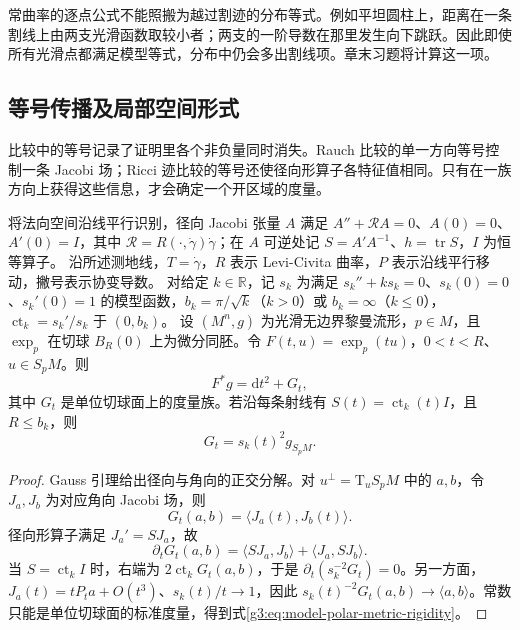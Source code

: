 常曲率的逐点公式不能照搬为越过割迹的分布等式。例如平坦圆柱上，距离在一条割线上由两支光滑函数取较小者；两支的一阶导数在那里发生向下跳跃。因此即使所有光滑点都满足模型等式，分布中仍会多出割线项。章末习题将计算这一项。

\subsection{等号传播及局部空间形式}
\label{g3:subsec:0704:04}

比较中的等号记录了证明里各个非负量同时消失。Rauch 比较的单一方向等号控制一条 Jacobi 场；Ricci 迹比较的等号还使径向形算子各特征值相同。只有在一族方向上获得这些信息，才会确定一个开区域的度量。

\begin{proposition}\label{g3:prop:radial-metric-evolution}
	将法向空间沿线平行识别，径向 Jacobi 张量 \(A\) 满足 \(A''+\mathcal RA=0\)、\(A(0)=0\)、\(A'(0)=I\)，其中 \(\mathcal R=R(\cdot,\dot\gamma)\dot\gamma\)；在 \(A\) 可逆处记 \(S=A'A^{-1}\)、\(h=\operatorname{tr}S\)，\(I\) 为恒等算子。
	沿所述测地线，\(T=\dot\gamma\)，\(R\) 表示 Levi-Civita 曲率，\(P\) 表示沿线平行移动，撇号表示协变导数。
	对给定 \(k\in\mathbb R\)，记 \(s_k\) 为满足 \(s_k''+ks_k=0\)、\(s_k(0)=0\)、\(s_k'(0)=1\) 的模型函数，\(b_k=\pi/\sqrt k\)（\(k>0\)）或 \(b_k=\infty\)（\(k\le0\)），\(\operatorname{ct}_k=s_k'/s_k\) 于 \((0,b_k)\)。
	设 \((M^n,g)\) 为光滑无边界黎曼流形，\(p\in M\)，且 \(\exp_p\) 在切球 \(B_R(0)\) 上为微分同胚。令 \(F(t,u)=\exp_p(tu)\)，\(0<t<R\)、\(u\in S_pM\)。则
	\[
		F^*g=\mathrm{d}t^2+G_t,
	\]
	其中 \(G_t\) 是单位切球面上的度量族。若沿每条射线有 \(S(t)=\operatorname{ct}_k(t)I\)，且 \(R\le b_k\)，则
	\begin{equation}\label{g3:eq:model-polar-metric-rigidity}
		G_t=s_k(t)^2g_{S_pM}.
	\end{equation}
\end{proposition}
\begin{proof}
	Gauss 引理给出径向与角向的正交分解。对 \(u^\perp=\mathrm{T}_uS_pM\) 中的 \(a,b\)，令 \(J_a,J_b\) 为对应角向 Jacobi 场，则
	\[
		G_t(a,b)=\langle J_a(t),J_b(t)\rangle.
	\]
	径向形算子满足 \(J_a'=SJ_a\)，故
	\[
		\partial_tG_t(a,b)
		=\langle SJ_a,J_b\rangle+\langle J_a,SJ_b\rangle.
	\]
	当 \(S=\operatorname{ct}_k I\) 时，右端为 \(2\operatorname{ct}_kG_t(a,b)\)，于是 \(\partial_t(s_k^{-2}G_t)=0\)。另一方面，\(J_a(t)=tP_ta+O(t^3)\)、\(s_k(t)/t\to1\)，因此 \(s_k(t)^{-2}G_t(a,b)\to\langle a,b\rangle\)。常数只能是单位切球面的标准度量，得到式\eqref{g3:eq:model-polar-metric-rigidity}。
\end{proof}

